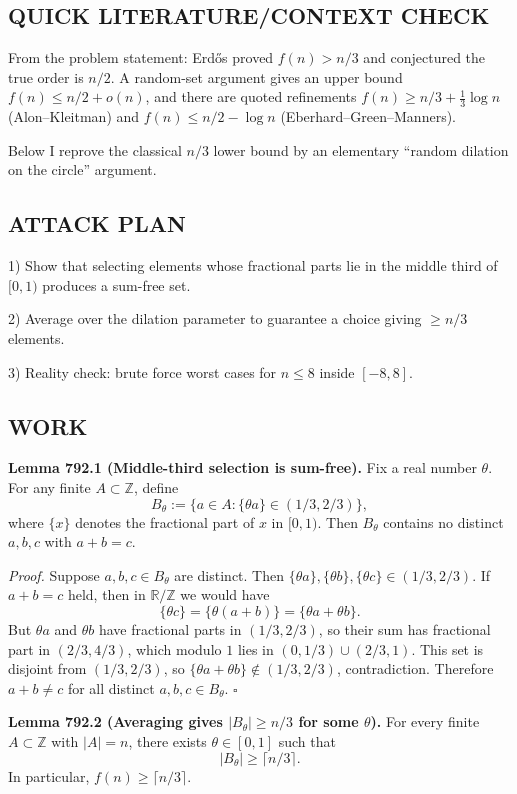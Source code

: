 \subsection*{QUICK LITERATURE/CONTEXT CHECK}
From the problem statement: Erd\H{o}s proved $f(n)>n/3$ and conjectured the true order is $n/2$. A random-set argument gives an upper bound $f(n)\le n/2+o(n)$, and there are quoted refinements
$f(n)\ge n/3 + \tfrac13\log n$ (Alon--Kleitman) and $f(n)\le n/2-\log n$ (Eberhard--Green--Manners).

Below I reprove the classical $n/3$ lower bound by an elementary ``random dilation on the circle'' argument.

\subsection*{ATTACK PLAN}
1) Show that selecting elements whose fractional parts lie in the middle third of $[0,1)$ produces a sum-free set.

2) Average over the dilation parameter to guarantee a choice giving $\ge n/3$ elements.

3) Reality check: brute force worst cases for $n\le 8$ inside $[-8,8]$.

\subsection*{WORK}
\textbf{Lemma 792.1 (Middle-third selection is sum-free).}
Fix a real number $\theta$. For any finite $A\subset\mathbb Z$, define
\[
B_\theta := \{a\in A: \{\theta a\}\in (1/3,2/3)\},
\]
where $\{x\}$ denotes the fractional part of $x$ in $[0,1)$.
Then $B_\theta$ contains no distinct $a,b,c$ with $a+b=c$.

\emph{Proof.}
Suppose $a,b,c\in B_\theta$ are distinct. Then
$\{\theta a\},\{\theta b\},\{\theta c\}\in (1/3,2/3)$.
If $a+b=c$ held, then in $\mathbb R/\mathbb Z$ we would have
\[
\{\theta c\} = \{\theta(a+b)\} = \{\theta a + \theta b\}.
\]
But $\theta a$ and $\theta b$ have fractional parts in $(1/3,2/3)$, so their sum has fractional part in
$(2/3,4/3)$, which modulo $1$ lies in $(0,1/3)\cup(2/3,1)$.
This set is disjoint from $(1/3,2/3)$, so $\{\theta a+\theta b\}\notin (1/3,2/3)$, contradiction.
Therefore $a+b\ne c$ for all distinct $a,b,c\in B_\theta$.
\hfill$\square$

\medskip
\textbf{Lemma 792.2 (Averaging gives $|B_\theta|\ge n/3$ for some $\theta$).}
For every finite $A\subset\mathbb Z$ with $|A|=n$, there exists $\theta\in[0,1]$ such that
\[|B_\theta|\ge \lceil n/3\rceil.
\]
In particular, $f(n)\ge \lceil n/3\rceil$.

